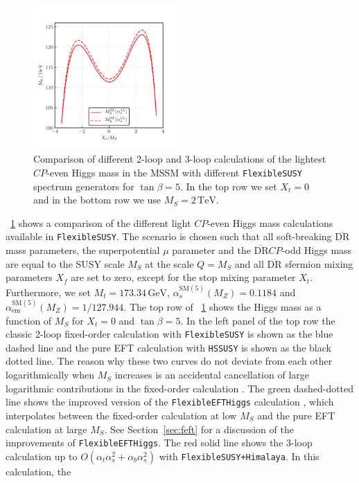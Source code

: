 \documentclass[final,3p,11pt,pdflatex]{elsarticle}
\makeatletter
\newcommand{\modelname}[1]{\texttt{#1}\@\xspace}
\newcommand{\fs}{\texttt{FlexibleSUSY}\@\xspace}
\newcommand{\HSSUSY}{\modelname{HSSUSY}}
\newcommand{\Himalaya}{\texttt{Himalaya}\@\xspace}
\newcommand{\fsh}{\texttt{FlexibleSUSY+}\Himalaya\xspace}
\newcommand{\feft}{\texttt{Flex\-ib\-le\-EFT\-Higgs}\@\xspace}
\newcommand{\ol}[1]{\overline{#1}}
\newcommand{\DRbar}{\ensuremath{\ol{\text{DR}}}\xspace}
\newcommand{\unit}[1]{\,\text{#1}}      %
\newcommand{\SM}{\ensuremath{\text{SM}}\xspace}
\newcommand{\MS}{\ensuremath{M_S}\xspace}
\newcommand{\figref}[1]{\figurename~\ref{#1}}
\newcommand{\secref}[1]{Section~\ref{#1}}
\newcommand{\CP}{\ensuremath{CP}\xspace}
\def\at{\alpha_t}
\def\ab{\alpha_b}
\def\as{\alpha_s}
\def\aem{\alpha_{\text{em}}}
\makeatother
\begin{document}
\begin{figure}[h!]
  \includegraphics[width=0.49\textwidth]{plots/Himalaya/scan_Mh_Xt_TB-5_MS-2000_delta_alpha}
  \caption{Comparison of different 2-loop and 3-loop calculations of
    the lightest \CP-even Higgs mass in the MSSM with different \fs
    spectrum generators for $\tan\beta = 5$.  In the top row we set
    $X_t = 0$ and in the bottom row we use $\MS = 2\unit{TeV}$.}
  \label{fig:Mh-himalaya}
\end{figure}
%
\figref{fig:Mh-himalaya} shows a comparison of the different light
\CP-even Higgs mass calculations available in \fs.  The scenario is
chosen such that all soft-breaking \DRbar mass parameters, the
superpotential
$\mu$ parameter and the \DRbar \CP-odd Higgs mass are equal to the SUSY
scale $\MS$ at the scale $Q =
\MS$ and all \DRbar sfermion mixing parameters
$X_f$ are set to zero, except for the stop mixing parameter
$X_t$.  Furthermore, we set $M_t =
173.34\unit{GeV}$, $\as^{\SM(5)}(M_Z) =
0.1184$ and $\aem^{\SM(5)}(M_Z) =
1/127.944$.  The top row of \figref{fig:Mh-himalaya} shows the Higgs
mass as a function of $\MS$ for $X_t = 0$ and $\tan\beta =
5$.  In the left panel of the top row the classic 2-loop fixed-order
calculation with \fs \cite{Athron:2014yba} is shown as the blue dashed
line and the pure EFT calculation with \HSSUSY is shown as the black
dotted line.  The reason why these two curves do not deviate from each
other logarithmically when
$\MS$ increases is an accidental cancellation of large
logarithmic contributions in the fixed-order calculation
\cite{Athron:2016fuq}.  The green dashed-dotted line shows the
improved version of the \feft calculation \cite{Athron:2016fuq}, which
interpolates
between the fixed-order calculation at low \MS and the pure EFT
calculation at large \MS.  See \secref{sec:feft} for a discussion of
the improvements of \feft.  The red solid line shows the 3-loop
calculation up to $O(\at\as^2 +
\ab\as^2)$ with \fsh \cite{Harlander:2017kuc}.  In this calculation, the
\end{document}
